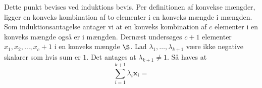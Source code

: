 Dette punkt bevises ved induktions bevis.
Per definitionen af konvekse mængder, ligger en konveks kombination af to elementer i en konveks mængde i mængden.
Som induktionsantagelse antager vi at en konveks kombination af $c$ elementer i en konveks mængde også er i mængden. Dernæst undersøges $c+1$ elementer $x_1,x_2,\ldots,x_c+1$ i en konveks mængde $\S$. Lad $\lambda_1,\ldots,\lambda_{k+1}$ være ikke negative skalarer som hvis sum er $1$. Det antages at $\lambda_{k+1}\neq1$. Så haves at
$$\sum^{k+1}_{i=1}\lambda_i\textbf{x}_i=$$